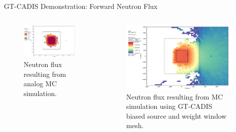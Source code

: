\documentclass{beamer}
\begin{document}
\begin{frame}{GT-CADIS Demonstration: Forward Neutron Flux}
	\begin{columns}
\begin{figure} 
	\includegraphics[width=6.1cm] {analog_tot_n_f.png}
	\caption [Analog neutron flux.] 
	{Neutron flux resulting from analog MC simulation.\label{fig:ex.ana_nflux}}
\end{figure}
		\vspace{0.6cm}
\begin{figure} 
	\includegraphics[width=6.1cm]{gtcadis_tot_n_f.png}
	\caption [GT-CADIS neutron flux] 
	{Neutron flux resulting from MC simulation using
	 GT-CADIS biased source and weight window mesh.\label{fig:ex.gt_nflux}}
\end{figure}
	\end{columns}
\end{frame}
\end{document}
